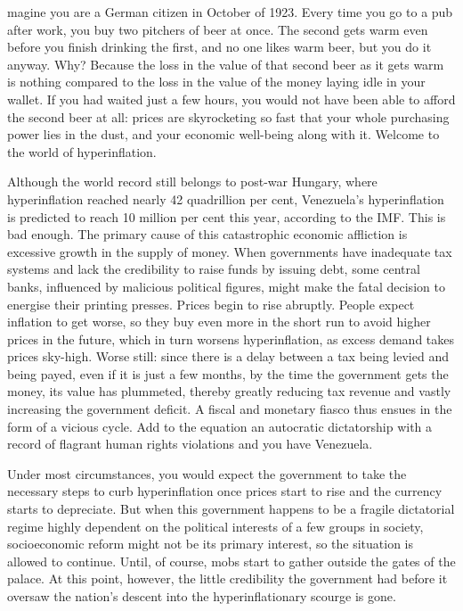 \label{ch:venezuelan-hyperinflation}

magine you are a German citizen in October of 1923. Every time you go to
   a pub after work, you buy two pitchers of beer at once. The second gets
   warm even before you finish drinking the first, and no one likes warm
   beer, but you do it anyway. Why? Because the loss in the value of that
   second beer as it gets warm is nothing compared to the loss in the
   value of the money laying idle in your wallet. If you had waited just a
   few hours, you would not have been able to afford the second beer at
   all: prices are skyrocketing so fast that your whole purchasing power
   lies in the dust, and your economic well-being along with it. Welcome
   to the world of hyperinflation.

   Although the world record still belongs to post-war Hungary, where
   hyperinflation reached nearly 42 quadrillion per cent, Venezuela's
   hyperinflation is predicted to reach 10 million per cent this year,
   according to the IMF. This is bad enough. The primary cause of this
   catastrophic economic affliction is excessive growth in the supply of
   money. When governments have inadequate tax systems and lack the
   credibility to raise funds by issuing debt, some central banks,
   influenced by malicious political figures, might make the fatal
   decision to energise their printing presses. Prices begin to rise
   abruptly. People expect inflation to get worse, so they buy even more
   in the short run to avoid higher prices in the future, which in turn
   worsens hyperinflation, as excess demand takes prices sky-high. Worse
   still: since there is a delay between a tax being levied and being
   payed, even if it is just a few months, by the time the government gets
   the money, its value has plummeted, thereby greatly reducing tax
   revenue and vastly increasing the government deficit. A fiscal and
   monetary fiasco thus ensues in the form of a vicious cycle. Add to the
   equation an autocratic dictatorship with a record of flagrant human
   rights violations and you have Venezuela.

   Under most circumstances, you would expect the government to take the
   necessary steps to curb hyperinflation once prices start to rise and
   the currency starts to depreciate. But when this government happens to
   be a fragile dictatorial regime highly dependent on the political
   interests of a few groups in society, socioeconomic reform might not be
   its primary interest, so the situation is allowed to continue. Until,
   of course, mobs start to gather outside the gates of the palace. At
   this point, however, the little credibility the government had before
   it oversaw the nation's descent into the hyperinflationary scourge is
   gone.

